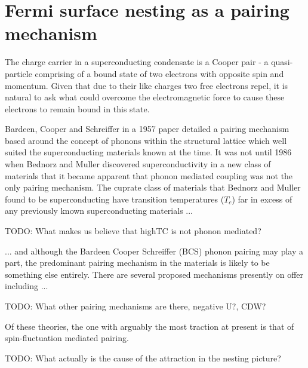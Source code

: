
\section{Fermi surface nesting as a pairing mechanism}

The charge carrier in a superconducting condensate is a Cooper pair - a quasi-particle comprising of a bound state of two electrons with opposite spin and momentum. Given that due to their like charges two free electrons repel, it is natural to ask what could overcome the electromagnetic force to cause these electrons to remain bound in this state.

Bardeen, Cooper and Schreiffer in a 1957 paper\cite{Bardeen1957} detailed a pairing mechanism based around the concept of phonons within the structural lattice which well suited the superconducting materials known at the time. It was not until 1986 when Bednorz and M\:uller\cite{Bednorz} discovered superconductivity in a new class of materials that it became apparent that phonon mediated coupling was not the only pairing mechanism. The cuprate class of materials that Bednorz and M\:uller found to be superconducting have transition temperatures ($T_c$) far in excess of any previously known superconducting materials ...

TODO: What makes us believe that highTC is not phonon mediated?

... and although the Bardeen Cooper Schreiffer (BCS) phonon pairing may play a part, the predominant pairing mechanism in the \highTc materials is likely to be something else entirely. There are several proposed mechanisms presently on offer including ...

TODO: What other pairing mechanisms are there, negative U?, CDW?

Of these theories, the one with arguably the most traction at present is that of spin-fluctuation mediated pairing. 

TODO: What actually is the cause of the attraction in the nesting picture?

